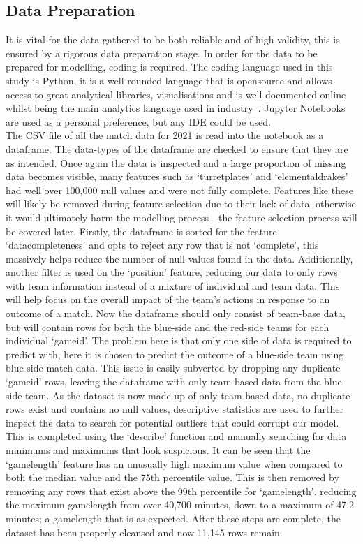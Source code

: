 \subsection{Data Preparation}\label{subsec:Data Preparation}
It is vital for the data gathered to be both reliable and of high validity, this is ensured by a rigorous data preparation stage.
In order for the data to be prepared for modelling, coding is required.
The coding language used in this study is Python, it is a well-rounded language that is opensource and allows access to great analytical libraries, visualisations and is well documented online whilst being the main analytics language used in industry~\citep{tiobePython}.
Jupyter Notebooks are used as a personal preference, but any IDE could be used. \\

The CSV file of all the match data for 2021 is read into the notebook as a dataframe.
The data-types of the dataframe are checked to ensure that they are as intended.
Once again the data is inspected and a large proportion of missing data becomes visible, many features such as `turretplates' and `elementaldrakes' had well over 100,000 null values and were not fully complete.
Features like these will likely be removed during feature selection due to their lack of data, otherwise it would ultimately harm the modelling process - the feature selection process will be covered later.
Firstly, the dataframe is sorted for the feature `datacompleteness' and opts to reject any row that is not `complete', this massively helps reduce the number of null values found in the data.
Additionally, another filter is used on the `position' feature, reducing our data to only rows with team information instead of a mixture of individual and team data.
This will help focus on the overall impact of the team's actions in response to an outcome of a match.
Now the dataframe should only consist of team-base data, but will contain rows for both the blue-side and the red-side teams for each individual `gameid'.
The problem here is that only one side of data is required to predict with, here it is chosen to predict the outcome of a blue-side team using blue-side match data.
This issue is easily subverted by dropping any duplicate `gameid' rows, leaving the dataframe with only team-based data from the blue-side team.
As the dataset is now made-up of only team-based data, no duplicate rows exist and contains no null values, descriptive statistics are used to further inspect the data to search for potential outliers that could corrupt our model.
This is completed using the `describe' function and manually searching for data minimums and maximums that look suspicious.
It can be seen that the `gamelength' feature has an unusually high maximum value when compared to both the median value and the 75th percentile value.
This is then removed by removing any rows that exist above the 99th percentile for `gamelength', reducing the maximum gamelength from over 40,700 minutes, down to a maximum of 47.2 minutes;
a gamelength that is as expected.
After these steps are complete, the dataset has been properly cleansed and now 11,145 rows remain.\\

